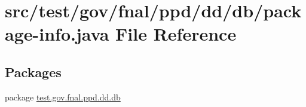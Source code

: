 \hypertarget{test_2gov_2fnal_2ppd_2dd_2db_2package-info_8java}{\section{src/test/gov/fnal/ppd/dd/db/package-\/info.java File Reference}
\label{test_2gov_2fnal_2ppd_2dd_2db_2package-info_8java}
}
\subsection*{Packages}
\begin{DoxyCompactItemize}
\item 
package \hyperlink{namespacetest_1_1gov_1_1fnal_1_1ppd_1_1dd_1_1db}{test.\-gov.\-fnal.\-ppd.\-dd.\-db}
\end{DoxyCompactItemize}
